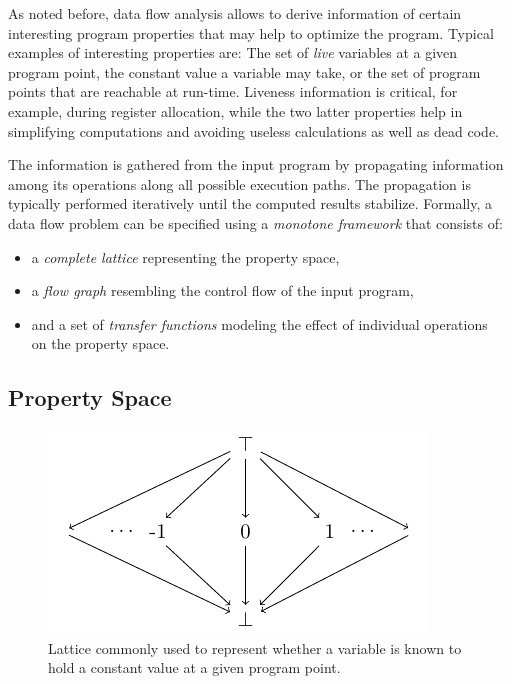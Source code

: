 As noted before, data flow analysis allows to derive information of certain
interesting program properties that may help to optimize the program. Typical
examples of interesting properties are: The set of \emph{live} variables at a
given program point, the constant value a variable may take, or the set of
program points that are reachable at run-time. Liveness information is critical,
for example, during register allocation, while the two latter properties help
in simplifying computations and avoiding useless calculations as well as dead
code.

The information is gathered from the input program by propagating information
among its operations along all possible execution paths. The
propagation is typically performed iteratively until the computed results
stabilize. Formally, a data flow problem can be specified using a \emph{monotone
framework} that consists of:
\begin{itemize}
  \item a \emph{complete lattice} representing the property space,
  \item a \emph{flow graph} resembling the control flow of the input program,
  \item and a set of \emph{transfer functions} modeling the effect of individual
        operations \\ on the property space.
\end{itemize}

\subsection{Property Space}
\label{novillo:sec:property_space}

\begin{figure}[b]
  \begin{center}
    \includegraphics{constprop_lattice}
  \end{center}
  \vspace{-1em}
  \caption{Lattice commonly used to represent whether a variable is known to
           hold a constant value at a given program point.}
  \label{novillo:fig:lattice_constant_propagation}
\end{figure}

